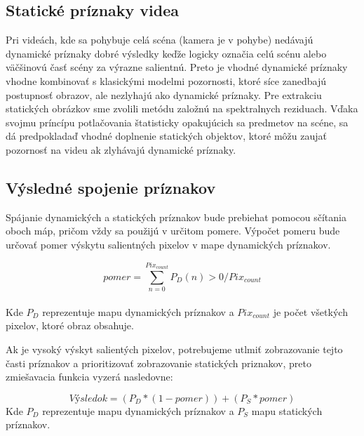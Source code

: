 \subsection{Statické príznaky videa}
Pri videách, kde sa pohybuje celá scéna (kamera je v pohybe) nedávajú dynamické príznaky dobré výsledky keďže logicky označia celú scénu alebo väčšinovú časť scény za výrazne salientnú.
Preto je vhodné dynamické príznaky vhodne kombinovať s klasickými modelmi pozornosti, ktoré síce zanedbajú postupnosť obrazov, ale nezlyhajú ako dynamické príznaky.
Pre extrakciu statických obrázkov sme zvolili metódu založnú na spektralnych reziduach\cite{spectral-rezidual}.
Vďaka svojmu príncípu potlačovania štatisticky opakujúcich sa predmetov na scéne, sa dá predpokladaď vhodné doplnenie statických objektov, ktoré môžu zaujať pozornosť na videu ak zlyhávajú dynamické príznaky.

\subsection{Výsledné spojenie príznakov}
Spájanie dynamických a statických príznakov bude prebiehat pomocou sčítania oboch máp, pričom vždy sa použijú v určitom pomere.
Výpočet pomeru bude určovať pomer výskytu salientných pixelov v mape dynamických príznakov.

\begin{equation}
pomer = \sum_{n=0}^{Pix_{count}} P_D(n) > 0 / Pix_{count}
\end{equation}
\\
Kde \begin{math}P_D\end{math} reprezentuje mapu dynamických príznakov a \begin{math}Pix_{count}\end{math} je počet všetkých pixelov, ktoré obraz obsahuje.

Ak je vysoký výskyt salientých pixelov, potrebujeme utlmiť zobrazovanie tejto časti príznakov a prioritizovať zobrazovanie statických priznakov, preto zmiešavacia funkcia vyzerá nasledovne:

\begin{equation}
  Výsledok = (P_D * (1-pomer)) + (P_S * pomer)
\end{equation}
Kde \begin{math}P_D\end{math} reprezentuje mapu dynamických príznakov a \begin{math}P_S\end{math} mapu statických príznakov.


